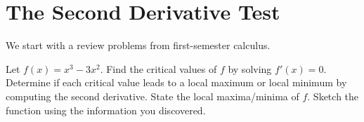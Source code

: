 

\section{The Second Derivative Test}
We start with a review problems from first-semester calculus.
\begin{problem}
 Let $f(x) = x^3-3x^2$.  Find the critical values of $f$ by solving $f'(x)=0$.  Determine if each critical value leads to a local maximum or local minimum by computing the second derivative. State the local maxima/minima of $f$. Sketch the function using the information you discovered.  
\end{problem}


